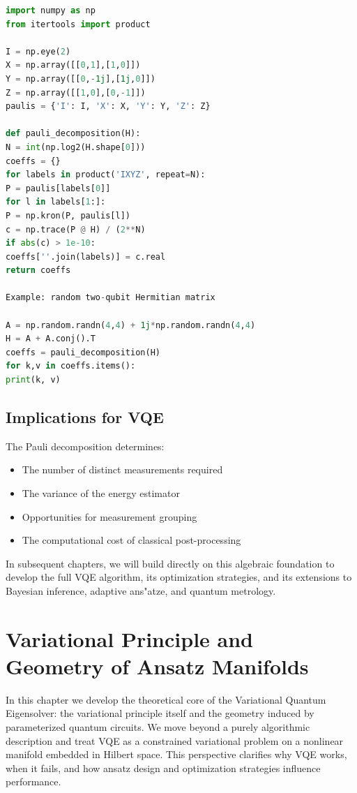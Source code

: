 \documentclass{book}
\begin{document}
\begin{lstlisting}[language=Python]
import numpy as np
from itertools import product

I = np.eye(2)
X = np.array([[0,1],[1,0]])
Y = np.array([[0,-1j],[1j,0]])
Z = np.array([[1,0],[0,-1]])
paulis = {'I': I, 'X': X, 'Y': Y, 'Z': Z}

def pauli_decomposition(H):
N = int(np.log2(H.shape[0]))
coeffs = {}
for labels in product('IXYZ', repeat=N):
P = paulis[labels[0]]
for l in labels[1:]:
P = np.kron(P, paulis[l])
c = np.trace(P @ H) / (2**N)
if abs(c) > 1e-10:
coeffs[''.join(labels)] = c.real
return coeffs

Example: random two-qubit Hermitian matrix

A = np.random.randn(4,4) + 1j*np.random.randn(4,4)
H = A + A.conj().T
coeffs = pauli_decomposition(H)
for k,v in coeffs.items():
print(k, v)
\end{lstlisting}

\section{Implications for VQE}

The Pauli decomposition determines:
\begin{itemize}
\item The number of distinct measurements required
\item The variance of the energy estimator
\item Opportunities for measurement grouping
\item The computational cost of classical post-processing
\end{itemize}

In subsequent chapters, we will build directly on this algebraic
foundation to develop the full VQE algorithm, its optimization
strategies, and its extensions to Bayesian inference, adaptive
ans"atze, and quantum metrology.


\chapter{Variational Principle and Geometry of Ansatz Manifolds}

In this chapter we develop the theoretical core of the Variational Quantum Eigensolver: the variational principle itself and the geometry induced by parameterized quantum circuits. We move beyond a purely algorithmic description and treat VQE as a constrained variational problem on a nonlinear manifold embedded in Hilbert space. This perspective clarifies why VQE works, when it fails, and how ansatz design and optimization strategies influence performance.
\end{document}
